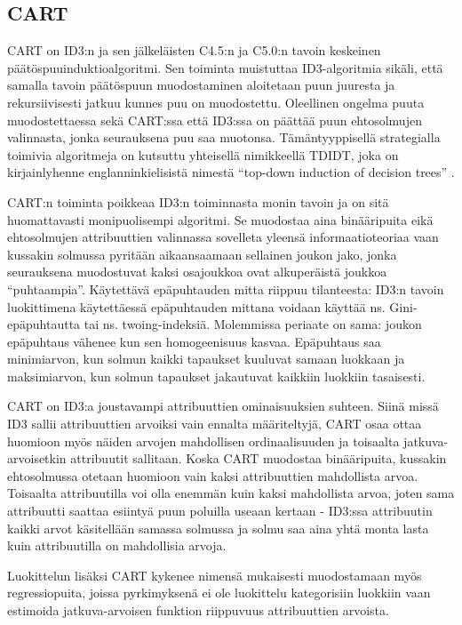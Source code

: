 \documentclass[12pt,finnish]{tktltiki2}
\theoremstyle{definition}
\theoremstyle{remark}
\begin{document}
\subsection{CART}
CART \cite{CART} on ID3:n ja sen jälkeläisten C4.5:n ja C5.0:n tavoin keskeinen päätöspuuinduktioalgoritmi. Sen toiminta muistuttaa ID3-algoritmia sikäli, että
samalla tavoin päätöspuun muodostaminen aloitetaan puun juuresta ja rekursiivisesti jatkuu kunnes puu on
muodostettu. Oleellinen ongelma puuta muodostettaessa sekä CART:ssa että ID3:ssa on päättää puun ehtosolmujen valinnasta,
jonka seurauksena puu saa muotonsa. Tämäntyyppisellä strategialla toimivia algoritmeja on kutsuttu yhteisellä nimikkeellä TDIDT, joka on
kirjainlyhenne englanninkielisistä nimestä ``top-down induction of decision trees'' \cite{quinlan}.

CART:n toiminta poikkeaa ID3:n toiminnasta monin tavoin ja on sitä huomattavasti monipuolisempi algoritmi.
Se muodostaa aina binääripuita eikä ehtosolmujen attribuuttien valinnassa sovelleta yleensä informaatioteoriaa vaan
kussakin solmussa pyritään aikaansaamaan sellainen joukon jako, jonka seurauksena muodostuvat kaksi osajoukkoa ovat alkuperäistä
joukkoa ``puhtaampia''. Käytettävä epäpuhtauden mitta riippuu tilanteesta: ID3:n tavoin luokittimena käytettäessä
epäpuhtauden mittana voidaan käyttää ns. Gini-epäpuhtautta tai ns. twoing-indeksiä. Molemmissa periaate on sama:
joukon epäpuhtaus vähenee kun sen homogeenisuus kasvaa. Epäpuhtaus saa minimiarvon, kun solmun kaikki tapaukset kuuluvat samaan
luokkaan ja maksimiarvon, kun solmun tapaukset jakautuvat kaikkiin luokkiin tasaisesti.

CART on ID3:a joustavampi attribuuttien ominaisuuksien suhteen. Siinä missä ID3 sallii attribuuttien
arvoiksi vain ennalta määriteltyjä, CART osaa ottaa huomioon myös näiden arvojen mahdollisen
ordinaalisuuden ja toisaalta jatkuva-arvoisetkin attribuutit sallitaan. Koska CART muodostaa
binääripuita, kussakin ehtosolmussa otetaan huomioon vain kaksi attribuuttien mahdollista arvoa. Toisaalta
attribuutilla voi olla enemmän kuin kaksi mahdollista arvoa, joten sama attribuutti saattaa esiintyä puun
poluilla useaan kertaan - ID3:ssa attribuutin kaikki arvot käsitellään samassa solmussa ja solmu
saa aina yhtä monta lasta kuin attribuutilla on mahdollisia arvoja.

Luokittelun lisäksi CART kykenee nimensä mukaisesti muodostamaan myös regressiopuita, joissa pyrkimyksenä
ei ole luokittelu kategorisiin luokkiin vaan estimoida jatkuva-arvoisen funktion riippuvuus
attribuuttien arvoista. 
\end{document}
